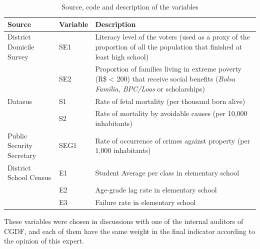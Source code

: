 \documentclass[conference]{IEEEtran}
\begin{document}
\begin{table}[h]
\small
\centering
\begin{tabularx}{\textwidth}{|l|l|X|}
\hline
\textbf{Source} & \textbf{Variable} & \textbf{Description} \\
\hline
District Domicile Survey & SE1 & Literacy level of the voters (used as a proxy of the proportion of all the population that finished at least high school) \\
\cline{2-3}
 & SE2 & Proportion of families living in extreme poverty (R\$ < 200) that receive social benefits (\textit{Bolsa Família, BPC/Loas} or scholarships)\\
\hline
Datasus & S1 & Rate of fetal mortality (per thousand born alive) \\
\cline{2-3}
 & S2 & Rate of mortality by avoidable causes (per 10,000 inhabitants)\\
\hline
Public Security Secretary & SEG1 & Rate of occurrence of crimes against property (per 1,000 inhabitants)\\
\hline
District School Census & E1 & Student Average per class in elementary school\\
\cline{2-3}
 & E2 & Age-grade lag rate in elementary school \\
\cline{2-3}
 & E3 & Failure rate in elementary school\\
\hline
\end{tabularx}
\caption{Source, code and description of the variables}
\label{tab:variaveis}
\end{table}

These variables were chosen in discussions with one of the internal auditors of CGDF, and each of them have the same weight in the final indicator according to the opinion of this expert. 
\end{document}
